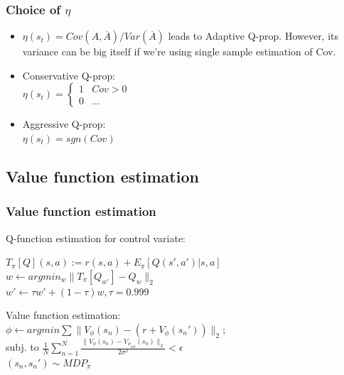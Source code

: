 \documentclass{beamer}
\begin{document}
\begin{frame}[t]
\frametitle{Choice of $\eta$}
\begin{itemize}
\item $\eta(s_t) = Cov(A,\overline{A})/Var(\overline{A})$ leads to Adaptive Q-prop. However, its variance can be big itself if we're using single sample estimation of Cov.
\item Conservative Q-prop: \\
$\eta(s_t) =
	\begin{cases}
		1 & \text{$Cov > 0$}\\
		0 & \text{...}
	\end{cases}$
\item Aggressive Q-prop: \\
$\eta(s_t) = sgn(Cov)$
	

\end{itemize}

\end{frame}

\subsection{Value function estimation}
\begin{frame}[t]
\frametitle{Value function estimation}
Q-function estimation for control variate:\\
\vspace{1mm}

$T_\pi[Q](s,a) := r(s,a) + E_\pi[Q(s',a') | s,a]$\\

$w \leftarrow argmin_w \| T_\pi[Q_{w'}] - Q_w \|_2$\\
$ w' \leftarrow \tau w' + (1-\tau) w, \tau = 0.999$

\vspace{4mm}

Value function estimation:\\
\vspace{1mm}
$\phi \leftarrow argmin \sum \| V_\phi(s_n) - (r + V_\phi(s_n')) \|_2$;\\
subj. to $\frac{1}{N} \sum_{n=1}^N \frac{\| V_\phi(s_n) - V_{\phi_{old}}(s_n) \|_2} {2\sigma^2} < \epsilon$\\
$(s_n,s_n') \sim MDP_\pi$


\end{frame}
\end{document}
